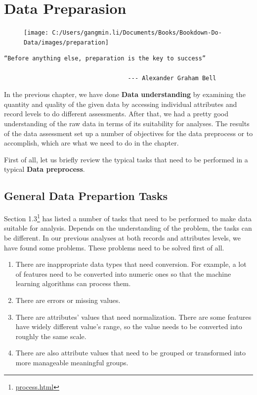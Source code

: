 \documentclass[
]{book}
\providecommand{\tightlist}{%
  \setlength{\itemsep}{0pt}\setlength{\parskip}{0pt}}
\renewenvironment{quote}{\begin{VF}}{\end{VF}}
\renewcommand{\href}[2]{#2\footnote{\url{#1}}}
\begin{document}
\hypertarget{data-preparasion}{%
\chapter{Data Preparasion}\label{data-preparasion}}

\begin{figure}

{\centering \texttt{[image: C:/Users/gangmin.li/Documents/Books/Bookdown-Do-Data/images/preparation]} 

}

\end{figure}

\begin{quote}
\begin{verbatim}
“Before anything else, preparation is the key to success” 

                                   --- Alexander Graham Bell
\end{verbatim}
\end{quote}

In the previous chapter, we have done \textbf{Data understanding} by examining the quantity and quality of the given data by accessing individual attributes and record levels to do different assessments. After that, we had a pretty good understanding of the raw data in terms of its suitability for analyses. The results of the data assessment set up a number of objectives for the data preprocess or to accomplish, which are what we need to do in the chapter.

First of all, let us briefly review the typical tasks that need to be performed in a typical \textbf{Data preprocess}.

\hypertarget{general-data-prepartion-tasks}{%
\section{General Data Prepartion Tasks}\label{general-data-prepartion-tasks}}

\href{process.html}{Section 1.3} has listed a number of tasks that need to be performed to make data suitable for analysis. Depends on the understanding of the problem, the tasks can be different. In our previous analyses at both records and attributes levels, we have found some problems. These problems need to be solved first of all.

\begin{enumerate}
\def\labelenumi{\arabic{enumi}.}
\tightlist
\item
  There are inappropriate data types that need conversion. For example, a lot of features need to be converted into numeric ones so that the machine learning algorithms can process them.
\item
  There are errors or missing values.
\item
  There are attributes' values that need normalization. There are some features have widely different value's range, so the value needs to be converted into roughly the same scale.
\item
  There are also attribute values that need to be grouped or transformed into more manageable meaningful groups.
\end{enumerate}
\end{document}
